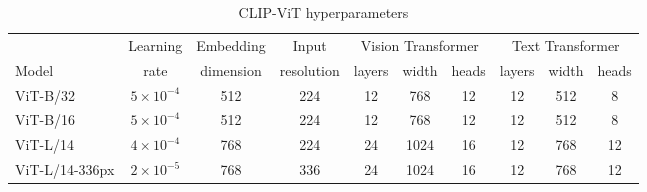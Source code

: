 \documentclass{article}
\begin{document}
\begin{table}[h!]
\begin{minipage}{\textwidth}
\small
\begin{tabular}{l|ccccccccc} \toprule
          & Learning & Embedding & Input      & \multicolumn{3}{c}{Vision Transformer} & \multicolumn{3}{c}{Text Transformer} \\
    Model & rate & dimension & resolution & layers & width & heads  & layers & width & heads \\ \midrule
    ViT-B/32 & $5 \times 10^{-4}$ & 512 & 224 & 12 & 768 & 12 & 12 & 512 & 8 \\
    ViT-B/16 & $5 \times 10^{-4}$ & 512 & 224 & 12 & 768 & 12 & 12 & 512 & 8 \\
    ViT-L/14 & $4 \times 10^{-4}$ & 768 & 224 & 24 & 1024 & 16 & 12 & 768 & 12 \\
    ViT-L/14-336px & $2 \times 10^{-5}$ & 768 & 336 & 24 & 1024 & 16 & 12 & 768 & 12 \\
    \bottomrule
\end{tabular}
\caption{CLIP-ViT hyperparameters}

\end{minipage}
\end{table}
\end{document}
